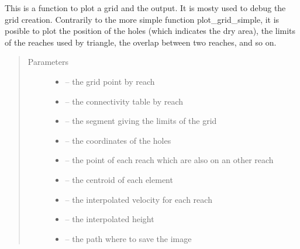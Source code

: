 \documentclass[letterpaper,10pt,english]{sphinxmanual}
\begin{document}

\begin{fulllineitems}
\label{\detokenize{index:src.manage_grid_8.plot_grid}}
This is a function to plot a grid and the output. It is mosty used to debug the grid creation. Contrarily to the more
simple function plot\_grid\_simple, it is posible to plot the position of the holes (which indicates the dry area),
the limits of the reaches used by triangle, the overlap between two reaches, and so on.
\begin{quote}\begin{description}
\item[{Parameters}] \leavevmode\begin{itemize}
\item {} 
 -- the grid point by reach

\item {} 
 -- the connectivity table by reach

\item {} 
 -- the segment giving the limits of the grid

\item {} 
 -- the coordinates of the holes

\item {} 
 -- the point of each reach which are also on an other reach

\item {} 
 -- the centroid of each element

\item {} 
 -- the interpolated velocity for each reach

\item {} 
 -- the interpolated height

\item {} 
 -- the path where to save the image

\end{itemize}

\end{description}\end{quote}

\end{fulllineitems}
\end{document}
